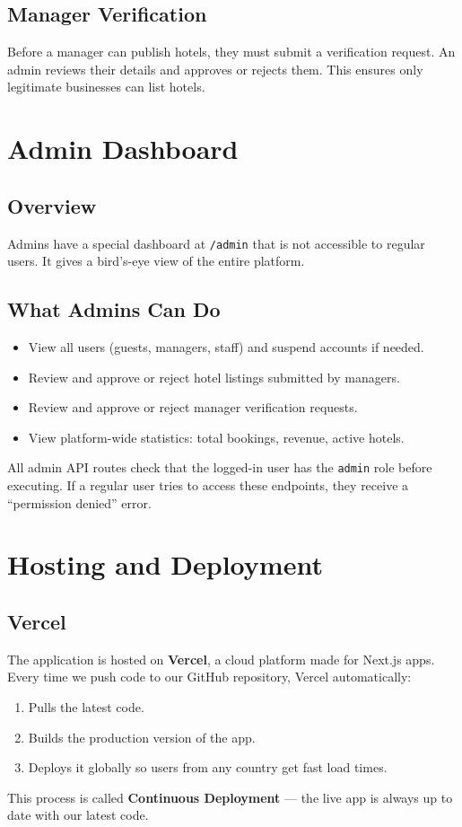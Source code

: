 \documentclass[12pt,a4paper]{article}
\begin{document}
\subsection{Manager Verification}
Before a manager can publish hotels, they must submit a verification request. An admin reviews their details and approves or rejects them. This ensures only legitimate businesses can list hotels.

\newpage
\section{Admin Dashboard}

\subsection{Overview}
Admins have a special dashboard at \texttt{/admin} that is not accessible to regular users. It gives a bird's-eye view of the entire platform.

\subsection{What Admins Can Do}
\begin{itemize}
  \item View all users (guests, managers, staff) and suspend accounts if needed.
  \item Review and approve or reject hotel listings submitted by managers.
  \item Review and approve or reject manager verification requests.
  \item View platform-wide statistics: total bookings, revenue, active hotels.
\end{itemize}

All admin API routes check that the logged-in user has the \texttt{admin} role before executing. If a regular user tries to access these endpoints, they receive a ``permission denied'' error.

\newpage
\section{Hosting and Deployment}

\subsection{Vercel}
The application is hosted on \textbf{Vercel}, a cloud platform made for Next.js apps. Every time we push code to our GitHub repository, Vercel automatically:
\begin{enumerate}
  \item Pulls the latest code.
  \item Builds the production version of the app.
  \item Deploys it globally so users from any country get fast load times.
\end{enumerate}
This process is called \textbf{Continuous Deployment} --- the live app is always up to date with our latest code.
\end{document}
